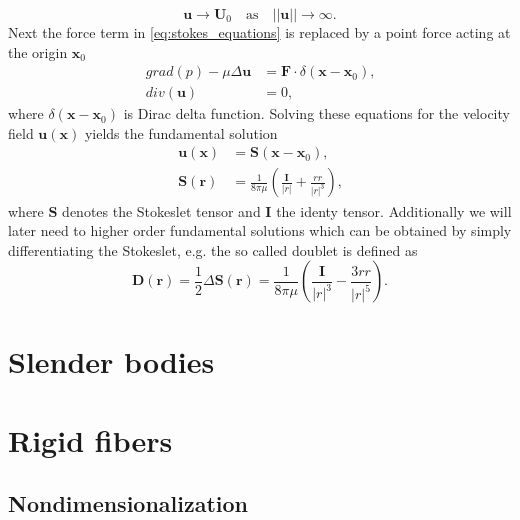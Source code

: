 \documentclass[a4paper,11pt]{kth-mag}
\begin{document}
\begin{equation}
  \label{eq:boundary_condition_background}
  \mathbf{u} \rightarrow \mathbf{U}_0 \quad \text{as} \quad ||\mathbf{u}|| \rightarrow \infty \text{.}
\end{equation}
Next the force term in \eqref{eq:stokes_equations} is replaced by a point force acting at the origin $\mathbf{x}_0$
\begin{equation}
  \label{eq:stokes_equations_point}
  \begin{aligned}
    grad(p) - \mu \Delta \mathbf{u} &= \mathbf{F} \cdot \delta(\mathbf{x} - \mathbf{x}_0) \text{,}\\
    div(\mathbf{u}) &= 0 \text{,}
  \end{aligned}
\end{equation}
where $\delta(\mathbf{x} - \mathbf{x}_0)$ is Dirac delta function. Solving these equations for the velocity field $\mathbf{u}(\mathbf{x})$ yields the fundamental solution
\begin{equation}
  \label{eq:stokeslet}
  \begin{aligned}
    \mathbf{u}(\mathbf{x}) &= \mathbf{S}(\mathbf{x}-\mathbf{x}_0) \text{,}\\
    \mathbf{S}(\mathbf{r}) &= \frac{1}{8\pi\mu} \left(\frac{\mathbf{I}}{|r|} + \frac{rr}{|r|^3}\right) \text{,}
  \end{aligned}
\end{equation}
where $\mathbf{S}$ denotes the Stokeslet tensor and $\mathbf{I}$ the identy tensor. Additionally we will later need to higher order fundamental solutions which can be obtained by simply differentiating the Stokeslet, e.g. the so called doublet is defined as
\begin{equation}
  \label{eq:doublet}
  \mathbf{D}(\mathbf{r}) = \frac{1}{2} \Delta\mathbf{S}(\mathbf{r}) = \frac{1}{8\pi\mu} \left(\frac{\mathbf{I}}{|r|^3} - \frac{3rr}{|r|^5}\right) \text{.}
\end{equation}

\section{Slender bodies}
\section{Rigid fibers}
\subsection{Nondimensionalization}
\end{document}
